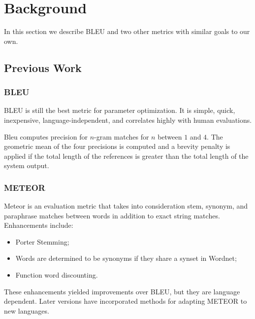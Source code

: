 
\section{Background}
\label{sec:background}

In this section we describe BLEU and two other metrics with similar goals to our own. 

\subsection{Previous Work}
\label{sec:prevwork}


\subsubsection{BLEU}
\label{sec:bleu}


BLEU is still the best metric for parameter optimization\cite{Cer:2010:BLM:1857999.1858079}. 
It is simple, quick, inexpensive, language-independent, and correlates highly with human evaluations. 


Bleu computes precision for $n$-gram matches for $n$ between $1$ and $4$. 
The geometric mean of the four precisions is computed and a brevity penalty is applied if the total length of the references is greater than the total length of the system output. 

\subsubsection{METEOR}
\label{sec:meteor}


Meteor is an evaluation metric that takes into consideration stem, synonym, and paraphrase matches between words in addition to exact string matches.
Enhancements include:
\begin{itemize}
\item 
Porter Stemming;
\item 
Words  are determined to  be synonyms if they share a synset in Wordnet;
\item 
Function word discounting.
\end{itemize}

These enhancements yielded improvements over BLEU, but they are language dependent. 
Later versions have incorporated methods for adapting METEOR to new languages. 


